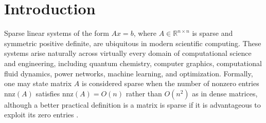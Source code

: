 \chapter{Introduction}
\label{ch:introduction}



Sparse linear systems of the form $Ax = b$, where $A \in \mathbb{R}^{n \times n}$ is sparse and symmetric positive definite, are ubiquitous in modern scientific computing. These systems arise naturally across virtually every domain of computational science and engineering, including quantum chemistry, computer graphics, computational fluid dynamics, power networks, machine learning, and optimization. Formally, one may state matrix $A$ is considered sparse when the number of nonzero entries $\text{nnz}(A)$ satisfies $\text{nnz}(A) = O(n)$ rather than $O(n^2)$ as in dense matrices, although a better practical definition is a matrix is sparse if it is advantageous to exploit its zero entries \cite{scott_introduction_2023}.







